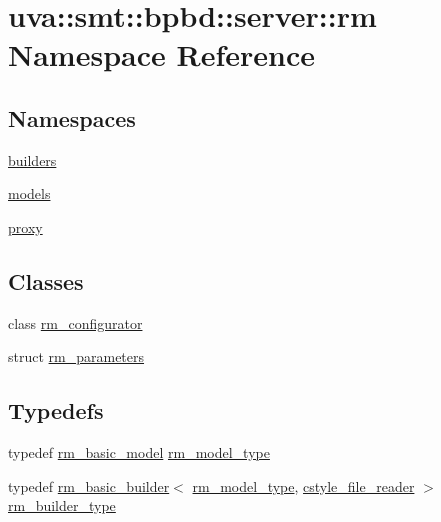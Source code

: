 \hypertarget{namespaceuva_1_1smt_1_1bpbd_1_1server_1_1rm}{}\section{uva\+:\+:smt\+:\+:bpbd\+:\+:server\+:\+:rm Namespace Reference}
\label{namespaceuva_1_1smt_1_1bpbd_1_1server_1_1rm}
\subsection*{Namespaces}
\begin{DoxyCompactItemize}
\item 
 \hyperlink{namespaceuva_1_1smt_1_1bpbd_1_1server_1_1rm_1_1builders}{builders}
\item 
 \hyperlink{namespaceuva_1_1smt_1_1bpbd_1_1server_1_1rm_1_1models}{models}
\item 
 \hyperlink{namespaceuva_1_1smt_1_1bpbd_1_1server_1_1rm_1_1proxy}{proxy}
\end{DoxyCompactItemize}
\subsection*{Classes}
\begin{DoxyCompactItemize}
\item 
class \hyperlink{classuva_1_1smt_1_1bpbd_1_1server_1_1rm_1_1rm__configurator}{rm\+\_\+configurator}
\item 
struct \hyperlink{structuva_1_1smt_1_1bpbd_1_1server_1_1rm_1_1rm__parameters}{rm\+\_\+parameters}
\end{DoxyCompactItemize}
\subsection*{Typedefs}
\begin{DoxyCompactItemize}
\item 
typedef \hyperlink{classuva_1_1smt_1_1bpbd_1_1server_1_1rm_1_1models_1_1rm__basic__model}{rm\+\_\+basic\+\_\+model} \hyperlink{namespaceuva_1_1smt_1_1bpbd_1_1server_1_1rm_a4d0c6c248c7451ba74697118cc6efa00}{rm\+\_\+model\+\_\+type}
\item 
typedef \hyperlink{classuva_1_1smt_1_1bpbd_1_1server_1_1rm_1_1builders_1_1rm__basic__builder}{rm\+\_\+basic\+\_\+builder}$<$ \hyperlink{namespaceuva_1_1smt_1_1bpbd_1_1server_1_1rm_a4d0c6c248c7451ba74697118cc6efa00}{rm\+\_\+model\+\_\+type}, \hyperlink{classuva_1_1utils_1_1file_1_1cstyle__file__reader}{cstyle\+\_\+file\+\_\+reader} $>$ \hyperlink{namespaceuva_1_1smt_1_1bpbd_1_1server_1_1rm_aaf06b65ebdbd4a141657ce0f28998e17}{rm\+\_\+builder\+\_\+type}
\end{DoxyCompactItemize}


